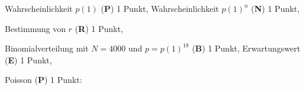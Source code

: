 \begin{bewertung}
\begin{teilaufgaben}
\item
Wahrscheinlichkeit $p(1)$ ({\bf P}) 1 Punkt,
Wahrscheinlichkeit $p(1)^n$ ({\bf N}) 1 Punkt,
\item
Bestimmung von $r$ ({\bf R}) 1 Punkt,
\item
Binomialverteilung mit $N=4000$ und $p=p(1)^18$ ({\bf B}) 1 Punkt,
Erwartungswert ({\bf E}) 1 Punkt,
\item
Poisson ({\bf P}) 1 Punkt:
\end{teilaufgaben}
\end{bewertung}





